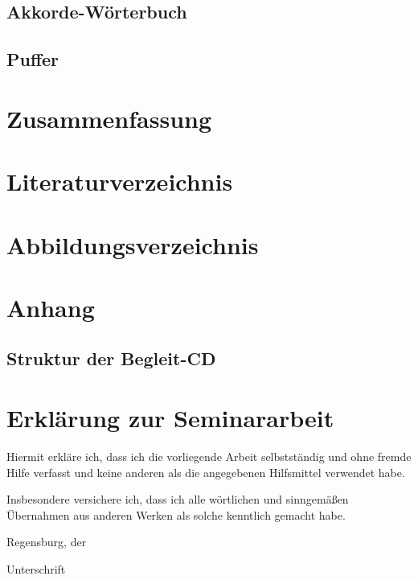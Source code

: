 \documentclass{article}
\begin{document}
\subsection{Akkorde-Wörterbuch}

\subsection{Puffer}

\section{Zusammenfassung}

\section{Literaturverzeichnis}

\section{Abbildungsverzeichnis}

\section{Anhang}

\subsection{Struktur der Begleit-CD}

\newpage

\section{Erklärung zur Seminararbeit}

Hiermit erkläre ich, dass ich die vorliegende Arbeit selbstständig und ohne fremde Hilfe verfasst
und keine anderen als die angegebenen Hilfsmittel verwendet habe.

Insbesondere versichere ich, dass ich alle wörtlichen und sinngemäßen Übernahmen aus anderen Werken
als solche kenntlich gemacht habe.

\vspace{1cm}

\noindent Regensburg, der

\hspace{0.6\linewidth} Unterschrift
\end{document}
